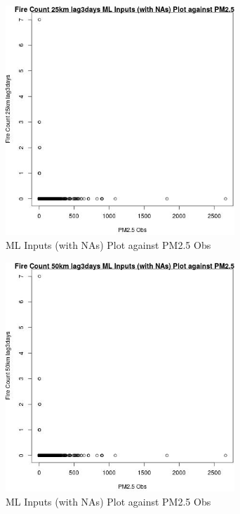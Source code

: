 \begin{figure} 
\centering  
\includegraphics[width=0.77\textwidth]{Code_Outputs/Report_ML_input_PM25_Step4_part_e_de_duplicated_aves_compiled_2019-05-20wNAs_Fire_Count_25km_lag3daysvPM25_Obs.jpg} 
\caption{\label{fig:Report_ML_input_PM25_Step4_part_e_de_duplicated_aves_compiled_2019-05-20wNAsFire_Count_25km_lag3daysvPM25_Obs}ML Inputs (with NAs) Plot against PM2.5 Obs} 
\end{figure} 
 

\begin{figure} 
\centering  
\includegraphics[width=0.77\textwidth]{Code_Outputs/Report_ML_input_PM25_Step4_part_e_de_duplicated_aves_compiled_2019-05-20wNAs_Fire_Count_50km_lag3daysvPM25_Obs.jpg} 
\caption{\label{fig:Report_ML_input_PM25_Step4_part_e_de_duplicated_aves_compiled_2019-05-20wNAsFire_Count_50km_lag3daysvPM25_Obs}ML Inputs (with NAs) Plot against PM2.5 Obs} 
\end{figure} 
 

